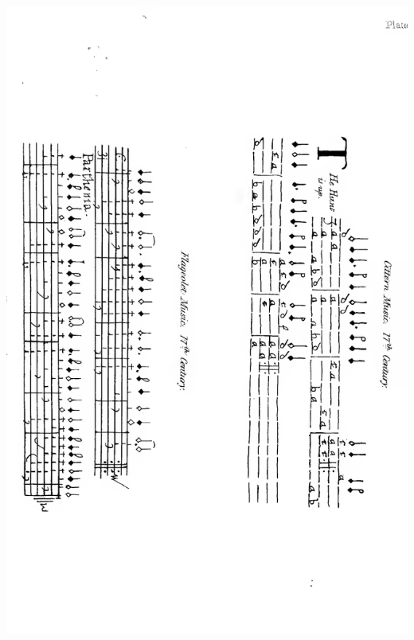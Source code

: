 \thispagestyle{empty}
\noindent\includegraphics*[width=\textwidth]{images/Plate5X.pdf}
\pagebreak

\intentionalemptypage 
